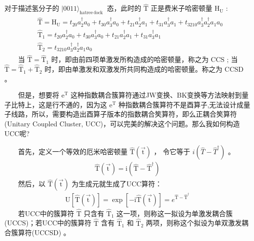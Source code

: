 \documentclass[a4paper,11pt,english]{sphinxmanual}
\begin{document}
\sphinxAtStartPar
对于描述氢分子的 \(|0011\rangle_{\text {hatree-fock }}\) 态，此时的 \(\mathrm{\hat{T}}\) 正是费米子哈密顿量 \(\mathrm{H}_{\mathrm{U}}\) :
\begin{equation*}
\begin{split}\begin{aligned} &\mathrm{\hat{T}}=\mathrm{H}_{\mathrm{U}}=t_{20} a_{2}^{\dagger} a_{0}+t_{30} a_{3}^{\dagger} a_{0}+t_{21} a_{2}^{\dagger} a_{1}+t_{31} a_{3}^{\dagger} a_{1}+t_{3210} a_{3}^{\dagger} a_{2}^{\dagger} a_{1} a_{0} \\ &\mathrm{\hat{T}}_{1}=t_{20} a_{2}^{\dagger} a_{0}+t_{30} a_{3}^{\dagger} a_{0}+t_{21} a_{2}^{\dagger} a_{1}+t_{31} a_{3}^{\dagger} a_{1} \\ &\mathrm{\hat{T}}_{2}=t_{3210} a_{3}^{\dagger} a_{2}^{\dagger} a_{1} a_{0} \end{aligned}\end{split}
\end{equation*}
\sphinxAtStartPar
  当 \(\mathrm{\hat{T}}=\mathrm{\hat{T}}_1\) 时，即由前四项单激发所构造成的哈密顿量，称之为 \(\mathrm{CCS}\) ; 当  \(\mathrm{\hat{T}}=\mathrm{\hat{T}}_1+\mathrm{\hat{T}}_2\) 时，即由单激发和双激发所共同构造成的哈密顿量。称之为 \(\mathrm{CCSD}\) 。

\sphinxAtStartPar
{}

\sphinxAtStartPar
  但是，想要将 \(\mathrm{e}^{\mathrm{T}}\) 这种指数耦合簇算符通过J\sphinxhyphen{}W变换、B\sphinxhyphen{}K变换等方法映射到量子比特上，这是行不通的，因为这 \(\mathrm{e}^{\mathrm{T}}\) 种指数耦合簇算符不是酉算子,无法设计成量子线路，所以，需要构造出酉算子版本的指数耦合笶算符，即么正耦合笶算符 (Unitary Coupled Cluster, UCC)，可以完美的解决这个问题。那么我如何构造UCC呢?

\sphinxAtStartPar
  首先，定义一个等效的厄米哈密顿量  \(\mathrm{\hat{T}(\vec{ \mathrm{t}})}\) ， 令它等于 \(i\left(\hat{T}-\hat{T}^{\dagger}\right)\) 。
\begin{equation*}
\begin{split}\mathrm{\hat{T}}(\vec{\mathrm{t}})=\mathrm{i}\left(\mathrm{\hat{T}}-\mathrm{\hat{T}}^{\dagger}\right)\end{split}
\end{equation*}
\sphinxAtStartPar
  然后，以  \(\mathrm{\hat{T}(\vec{ \mathrm{t}})}\) 为生成元就生成了UCC算符：
\begin{equation*}
\begin{split}\mathrm{U}[\mathrm{\hat{T}(\vec{ \mathrm{t}})}]=\exp [-\mathrm{i\hat{T}}({\vec{ \mathrm{t}}})]=e^{\mathrm{\hat{T}}-\mathrm{\hat{T}}^{\dagger}}\end{split}
\end{equation*}
\sphinxAtStartPar
  若UCC中的簇算符  \(\mathrm{\hat{T}}\) 只含有 \(\mathrm{\hat{T}}_1\) 这一项，则称这一拟设为单激发耦合簇 (UCCS)；若UCC中的簇算符 \(\mathrm{\hat{T}}\) 含有 \(\mathrm{\hat{T}}_{1}\) 和 \(\mathrm{\hat{T}}_{2}\) 两项，则称这个拟设为单双激发耦合簇算符(UCCSD) 。
\end{document}

